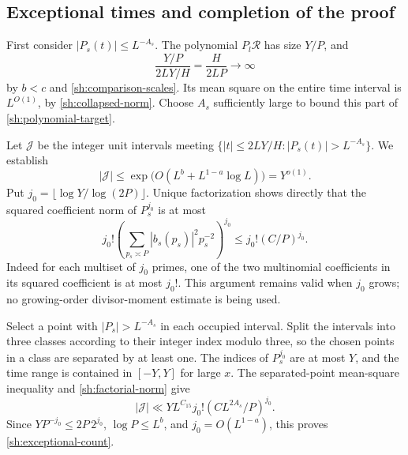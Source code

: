 \subsection{Exceptional times and completion of the proof}

First consider $|P_s(t)|\leq L^{-A_s}$.  The polynomial
$P_l\mathcal R$ has size $Y/P$, and
\[
 \frac{Y/P}{2LY/H}=\frac{H}{2LP}\longrightarrow\infty
\]
by $b<c$ and \eqref{sh:comparison-scales}.  Its mean square on
the entire time interval is $L^{O(1)}$, by
\eqref{sh:collapsed-norm}.  Choose $A_s$ sufficiently large to
bound this part of \eqref{sh:polynomial-target}.

Let $\mathcal J$ be the integer unit intervals meeting
$\{|t|\leq2LY/H:|P_s(t)|>L^{-A_s}\}$.  We establish
\begin{equation}\label{sh:exceptional-count}
 |\mathcal J|\leq
 \exp\big(O(L^b+L^{1-a}\log L)\big)=Y^{o(1)}.
\end{equation}
Put $j_0=\lfloor\log Y/\log(2P)\rfloor$.  Unique factorization
shows directly that the squared coefficient norm of $P_s^{j_0}$
is at most
\begin{equation}\label{sh:factorial-norm}
 j_0!\left(\sum_{p_s\asymp P}|b_s(p_s)|^2p_s^{-2}\right)^{j_0}
 \leq j_0!(C/P)^{j_0}.
\end{equation}
Indeed for each multiset of $j_0$ primes, one of the two multinomial
coefficients in its squared coefficient is at most $j_0!$.
This argument remains valid when $j_0$ grows; no growing-order
divisor-moment estimate is being used.

Select a point with $|P_s|>L^{-A_s}$ in each occupied interval.
Split the intervals into three classes according to their integer
index modulo three, so the chosen points in a class are separated
by at least one.  The indices of $P_s^{j_0}$ are at most $Y$, and
the time range is contained in $[-Y,Y]$ for large $x$.  The
separated-point mean-square inequality and \eqref{sh:factorial-norm}
give
\[
 |\mathcal J|\ll YL^{C_{15}}j_0!
                         (CL^{2A_s}/P)^{j_0}.
\]
Since $YP^{-j_0}\leq2P\,2^{j_0}$,
$\log P\leq L^b$, and $j_0=O(L^{1-a})$, this proves
\eqref{sh:exceptional-count}.

